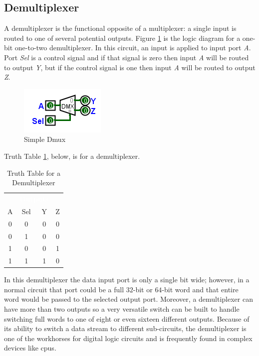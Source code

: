 \subsection{Demultiplexer}
\label{CL:subsec:demultiplexer}

A demultiplexer is the functional opposite of a multiplexer: a single input is routed to one of several potential outputs. Figure \ref{fig:08_02} is the logic diagram for a one-bit one-to-two demultiplexer. In this circuit, an input is applied to input port \emph{A}. Port \emph{Sel} is a control signal and if that signal is zero then input \emph{A} will be routed to output \emph{Y}, but if the control signal is one then input \emph{A} will be routed to output \emph{Z}.

\begin{figure}[H]
	\centering
	\includegraphics[width=\maxwidth{.95\linewidth}]{gfx/08_02}
	\caption{Simple Dmux}
	\label{fig:08_02}
\end{figure}

Truth Table \ref{tab:08_02}, below, is for a demultiplexer.

\begin{table}[H]
  \sffamily
  \newcommand{\head}[1]{\textcolor{white}{\textbf{#1}}}    
  \begin{center}
    \begin{tabular}{cc|cc} 
      \rowcolor{black!75}
      \multicolumn{2}{c}{\head{Inputs}} & \multicolumn{2}{c}{\head{Outputs}} \\
      A & Sel & Y & Z \\
      \hline
      0 & 0 & 0 & 0 \\
      0 & 1 & 0 & 0 \\
      1 & 0 & 0 & 1 \\
      1 & 1 & 1 & 0 
    \end{tabular}
  \end{center}
  \caption{Truth Table for a Demultiplexer}
  \label{tab:08_02}
\end{table}

In this demultiplexer the data input port is only a single bit wide; however, in a normal circuit that port could be a full $ 32 $-bit or $ 64 $-bit word and that entire word would be passed to the selected output port. Moreover, a demultiplexer can have more than two outputs so a very versatile switch can be built to handle switching full words to one of eight or even sixteen different outputs. Because of its ability to switch a data stream to different sub-circuits, the demultiplexer is one of the workhorses for digital logic circuits and is frequently found in complex devices like \glspl{cpu}.

